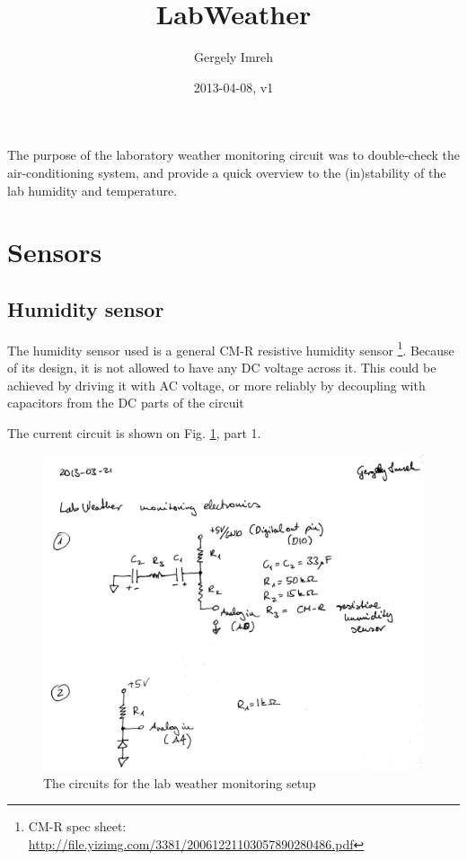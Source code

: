 \documentclass[12pt,a4paper]{article}
\author{Gergely Imreh}
\title{LabWeather}
\date{2013-04-08, v1}
\begin{document}
\maketitle

The purpose of the laboratory weather monitoring circuit was to double-check the air-conditioning system, and provide a quick overview to the (in)stability of the lab humidity and temperature.

\tableofcontents

\section{Sensors}

\subsection{Humidity sensor}

The humidity sensor used is a general CM-R resistive humidity sensor \footnote{CM-R spec sheet: \url{http://file.yizimg.com/3381/20061221103057890280486.pdf}}. Because of its design, it is not allowed to have any DC voltage across it. This could be achieved by driving it with AC voltage, or more reliably by decoupling with capacitors from the DC parts of the circuit

The current circuit is shown on Fig. \ref{fig:circuit}, part 1.

\begin{figure}[ht!]
\centering
\includegraphics[width=140mm]{circuit.jpg}
\caption{The circuits for the lab weather monitoring setup}
\label{fig:circuit}
\end{figure}
\end{document}

